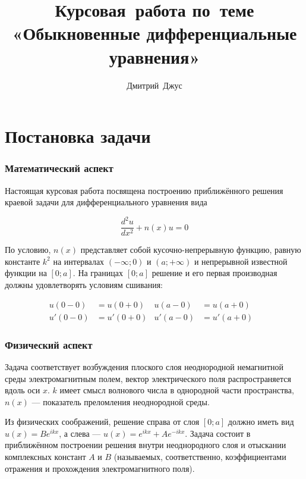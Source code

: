 \documentclass{article}
\numberwithin{equation}{section}
\begin{document}
\author{Дмитрий Джус}
\title{Курсовая работа по теме\\ «Обыкновенные дифференциальные уравнения»}
\maketitle

\newpage

\tableofcontents

\newpage
\part{Постановка задачи}

\section{Математический аспект}

Настоящая курсовая работа посвящена построению приближённого решения
краевой задачи для дифференциального уравнения вида

\begin{equation}\label{deq}
  \frac{d^2 u}{dx^2} + n(x) u = 0
\end{equation}

По условию, $n(x)$ представляет собой кусочно-непрерывную функцию,
равную константе $k^2$ на интервалах $(-\infty; 0)$ и $(a; +\infty)$ и
непрерывной известной функции на $[0; a]$. На границах $[0; a]$
решение и его первая производная должны удовлетворять условиям
сшивания:

\begin{subequations}\label{conds}
  \begin{align}
    u(0-0)& = u(0+0)&
    u(a-0)& = u(a+0)& \\
    u'(0-0)& = u'(0+0)&
    u'(a-0)& = u'(a+0)&
  \end{align}
\end{subequations}

\section{Физический аспект}

Задача соответствует возбуждения плоского слоя неоднородной
немагнитной среды электромагнитным полем, вектор электрического поля
распространяется вдоль оси $x$. $k$ имеет смысл волнового числа в
однородной части пространства, $n(x)$ — показатель преломления
неоднородной среды.

Из физических соображений, решение справа от слоя $[0; a]$ должно
иметь вид $u(x) = Be^{ikx}$, а слева — $u(x) = e^{ikx} +
Ae^{-ikx}$. Задача состоит в приближённом построении решения внутри
неоднородного слоя и отыскании комплексных констант $A$ и $B$
(называемых, соответственно, коэффициентами отражения и прохождения
электромагнитного поля).
\end{document}
